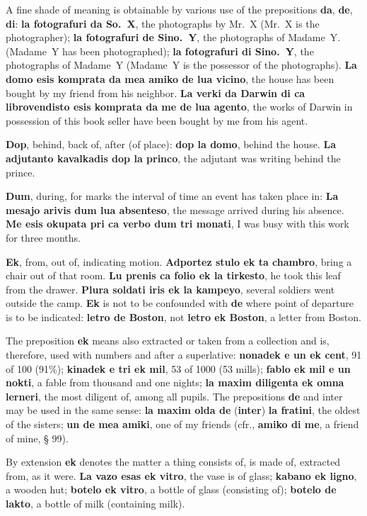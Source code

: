 A fine shade of meaning is obtainable by various use of the prepositions \textbf{da}, \textbf{de}, \textbf{di}: \textbf{la fotografuri da So.~X}, the photographs by Mr.~X (Mr.~X is the photographer); \textbf{la fotografuri de Sino.~Y}, the photographs of Madame~Y. (Madame~Y has been photographed); \textbf{la fotografuri di Sino.~Y}, the photographs of Madame~Y (Madame~Y is the possessor of the photographs). \textbf{La domo esis komprata da mea amiko de lua vicino}, the house has been bought by my friend from his neighbor. \textbf{La verki da Darwin di ca librovendisto esis komprata da me de lua agento}, the works of Darwin in possession of this book seller have been bought by me from his agent.

\textbf{Dop}, behind, back of, after (of place): \textbf{dop la domo}, behind the house. \textbf{La adjutanto kavalkadis dop la princo}, the adjutant was writing behind the prince.

\textbf{Dum}, during, for marks the interval of time an event has taken place in: \textbf{La mesajo arivis dum lua absenteso}, the message arrived during his absence. \textbf{Me esis okupata pri ca verbo dum tri monati}, I was busy with this work for three months.

\textbf{Ek}, from, out of, indicating motion. \textbf{Adportez stulo ek ta chambro}, bring a chair out of that room. \textbf{Lu prenis ca folio ek la tirkesto}, he took this leaf from the drawer. \textbf{Plura soldati iris ek la kampeyo}, several soldiers went outside the camp. \textbf{Ek} is not to be confounded with \textbf{de} where point of departure is to be indicated: \textbf{letro de Boston}, not \textbf{letro ek Boston}, a letter from Boston.

The preposition \textbf{ek} means also extracted or taken from a collection and is, therefore, used with numbers and after a superlative: \textbf{nonadek e un ek cent}, 91 of 100 (91\%); \textbf{kinadek e tri ek mil}, 53 of 1000 (53 mills); \textbf{fablo ek mil e un nokti}, a fable from thousand and one nights; \textbf{la maxim diligenta ek omna lerneri}, the most diligent of, among all pupils. The prepositions \textbf{de} and inter may be used in the same sense: \textbf{la maxim olda de }(\textbf{inter})\textbf{ la fratini}, the oldest of the sisters; \textbf{un de mea amiki}, one of my friends (cfr., \textbf{amiko di me}, a friend of mine, § 99).

By extension \textbf{ek} denotes the matter a thing consists of, is made of, extracted from, as it were. \textbf{La vazo esas ek vitro}, the vase is of glass; \textbf{kabano ek ligno}, a wooden hut; \textbf{botelo ek vitro}, a bottle of glass (consisting of); \textbf{botelo de lakto}, a bottle of milk (containing milk).

